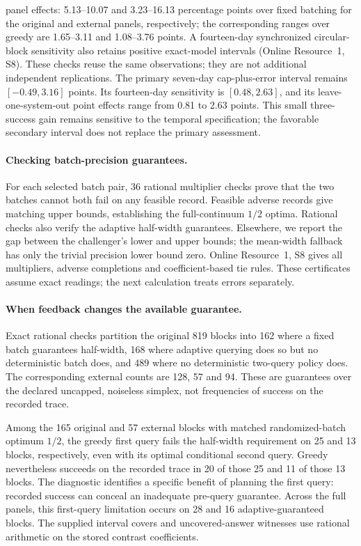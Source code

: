 \documentclass[12pt]{article}
\begin{document}
panel effects: 5.13--10.07 and 3.23--16.13 percentage points over fixed batching
for the original and external panels, respectively; the corresponding ranges
over greedy are 1.65--3.11 and 1.08--3.76 points. A fourteen-day
synchronized circular-block sensitivity also retains positive exact-model
intervals (Online Resource~1, S8). These checks reuse the same observations;
they are not additional independent replications. The primary seven-day
cap-plus-error interval remains $[-0.49,3.16]$ points. Its fourteen-day
sensitivity is $[0.48,2.63]$, and its leave-one-system-out point effects range
from 0.81 to 2.63 points. This small three-success gain remains sensitive to
the temporal specification; the favorable secondary interval does not replace
the primary assessment.
\paragraph{Checking batch-precision guarantees.}
For each selected batch pair, 36 rational multiplier checks prove that the
two batches cannot both fail on any feasible record. Feasible adverse
records give matching upper bounds, establishing the full-continuum $1/2$
optima. Rational checks also verify the adaptive half-width guarantees.
Elsewhere, we report the gap between the challenger's lower and upper bounds;
the mean-width fallback has only the trivial precision lower bound zero.
Online Resource~1, S8 gives all multipliers, adverse completions and
coefficient-based tie rules. These certificates assume exact readings;
the next calculation treats errors separately.
\paragraph{When feedback changes the available guarantee.}
Exact rational checks partition the original 819 blocks into 162 where a fixed batch guarantees half-width, 168 where adaptive querying does so but no deterministic batch does, and 489 where no deterministic two-query policy does. The corresponding external counts are 128, 57 and 94. These are guarantees over the declared uncapped, noiseless simplex, not frequencies of success on the recorded trace.

Among the 165 original and 57 external blocks with matched randomized-batch optimum $1/2$, the greedy first query fails the half-width requirement on 25 and 13 blocks, respectively, even with its optimal conditional second query. Greedy nevertheless succeeds on the recorded trace in 20 of those 25 and 11 of those 13 blocks. The diagnostic identifies a specific benefit of planning the first query: recorded success can conceal an inadequate pre-query guarantee. Across the full panels, this first-query limitation occurs on 28 and 16 adaptive-guaranteed blocks. The supplied interval covers and uncovered-answer witnesses use rational arithmetic on the stored contrast coefficients.
\end{document}
